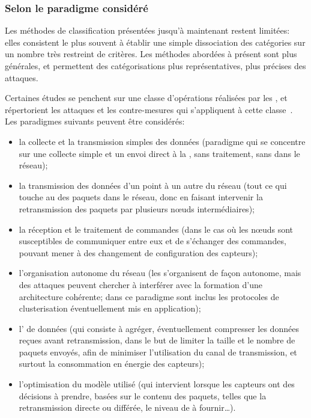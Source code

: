    \subsubsection{Selon le paradigme considéré}\label{ea:sss:paradigm}
Les méthodes de classification présentées jusqu'à maintenant restent limitées: elles consistent le plus souvent à établir une simple dissociation des catégories sur un nombre très restreint de critères.
Les méthodes abordées à présent sont plus générales, et permettent des catégorisations plus représentatives, plus précises des attaques.

Certaines études se penchent sur une classe d'opérations réalisées par les \rcs, et répertorient les attaques et les contre-mesures qui s'appliquent à cette classe~\cite{JPD06,OX09}.
Les paradigmes suivants peuvent être considérés:
\begin{itemize}
    \item la collecte et la transmission simples des données (paradigme qui se concentre sur une collecte simple et un envoi direct à la \sdb, sans traitement, sans  dans le réseau);
    \item la transmission des données d'un point à un autre du réseau (\cad tout ce qui touche au  des paquets dans le réseau, donc en faisant intervenir la retransmission des paquets par plusieurs nœuds intermédiaires);
    \item la réception et le traitement de commandes (dans le cas où les nœuds sont susceptibles de communiquer entre eux et de s'échanger des commandes, pouvant mener à des changement de configuration des capteurs);
    \item l'organisation autonome du réseau (les \rcs s'organisent de façon autonome, mais des attaques peuvent chercher à interférer avec la formation d'une architecture cohérente; dans ce paradigme sont inclus les protocoles de clusterisation éventuellement mis en application);
    \item l' de données (qui consiste à agréger, éventuellement compresser les données reçues avant retransmission, dans le but de limiter la taille et le nombre de paquets envoyés, afin de minimiser l'utilisation du canal de transmission, et surtout la consommation en énergie des capteurs);
    \item l'optimisation du modèle utilisé (qui intervient lorsque les capteurs ont des décisions à prendre, basées sur le contenu des paquets, telles que la retransmission directe ou différée, le niveau de \secu à fournir\dots).
\end{itemize}

